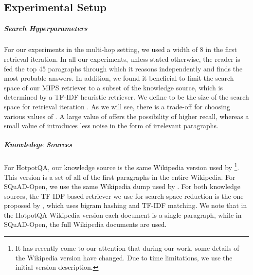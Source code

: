 \documentclass[11pt,a4paper,dvipsnames]{article}
\begin{document}
\subsection{Experimental Setup}
\subparagraph{Search Hyperparameters}
For our experiments in the multi-hop setting, we used a width of 8 in the first retrieval iteration. In all our experiments, unless stated otherwise, the reader is fed the top 45 paragraphs through which it reasons independently and finds the most probable answers. In addition, we found it beneficial to limit the search space of our MIPS retriever to a subset of the knowledge source, which is determined by a TF-IDF heuristic retriever. We define  to be the size of the search space for retrieval iteration . As we will see, there is a trade-off for choosing various values of . A large value of  offers the possibility of higher recall, whereas a small value of  introduces less noise in the form of irrelevant paragraphs. \par
\subparagraph{Knowledege Sources}
For HotpotQA, our knowledge source is the same Wikipedia version used by \citet{Yang0ZBCSM18hotpot}\footnote{It has recently come to our attention that during our work, some details of the Wikipedia version have changed. Due to time limitations, we use the initial version description.}. This version is a set of all of the first paragraphs in the entire Wikipedia. For SQuAD-Open, we use the same Wikipedia dump used by \citet{ChenFWB17drqa}. For both knowledge sources, the TF-IDF based retriever we use for search space reduction is the one proposed by \citet{ChenFWB17drqa}, which uses bigram hashing and TF-IDF matching. We note that in the HotpotQA Wikipedia version each document is a single paragraph, while in SQuAD-Open, the full Wikipedia documents are used. 
\par 
\end{document}
